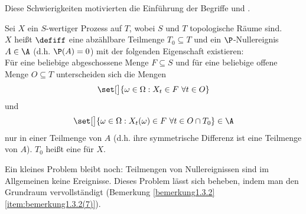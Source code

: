 Diese Schwierigkeiten motivierten die Einführung der Begriffe  und .

\begin{definition}\label{def2.1.1}
	Sei $X$ ein $S$-wertiger Prozess auf $T$, wobei $S$ und $T$ topologische Räume sind.\\
	$X$ heißt  $\defiff$ eine abzählbare Teilmenge $T_0\subseteq T$ und ein $\P$-Nullereignis $A\in\A$ (d.h. $\P(A)=0$) mit der folgenden Eigenschaft existieren:\\
	Für eine beliebige abgeschossene Menge $F\subseteq S$ und für eine beliebige offene Menge $O\subseteq T$ unterscheiden sich die Mengen
	\begin{align*}
		\set[\big]{\omega\in\Omega:X_t\in F~\forall t\in O}
	\end{align*}
	und 
	\begin{align*}
		\set[\big]{\omega\in\Omega:X_t(\omega)\in F~\forall t\in O\cap T_0}\in\A
	\end{align*}
	nur in einer Teilmenge von $A$ (d.h. ihre symmetrische Differenz ist eine Teilmenge von $A$).
	$T_0$ heißt eine  für $X$.
\end{definition}

\begin{bemerkungnr}\label{bemerkung2.1.2}
	Ein kleines Problem bleibt noch:
	Teilmengen von Nullereignissen sind im Allgemeinen keine Ereignisse.
	Dieses Problem lässt sich beheben, indem man den Grundraum vervollständigt (Bemerkung \ref{bemerkung1.3.2}\ref{item:bemerkung1.3.2(7)}).
\end{bemerkungnr}

